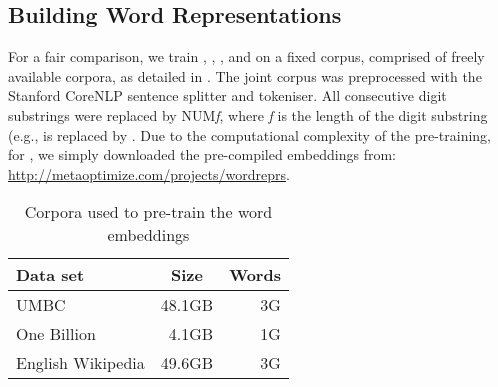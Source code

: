 \subsection{Building Word Representations}
\label{buildingWordRep}

For a fair comparison, we train \brown, \CBOW, \Skipgram, and \Glove on
a fixed corpus, comprised of freely available corpora, as detailed in
. The joint corpus was preprocessed with the
Stanford CoreNLP sentence splitter and tokeniser. All consecutive digit
substrings were replaced by NUM\textit{f}, where \textit{f} is the
length of the digit substring (e.g.,  is replaced by
. Due to the computational complexity of the
pre-training, for \CW, we simply downloaded the pre-compiled embeddings from:
\url{http://metaoptimize.com/projects/wordreprs}.

\begin{table}[t]
\centering
\begin{tabular}{lrr}
\hline
\textbf{Data set} & \multicolumn{1}{c}{\textbf{Size}} & \multicolumn{1}{c}{\textbf{Words}} \\ \hline
UMBC 	& 48.1GB & 3G \\
One Billion 	& 4.1GB & 1G  \\
English Wikipedia & 49.6GB & 3G \\ \hline
\end{tabular}
\caption{Corpora used to pre-train the word embeddings}
\label{wordEmbedCorpora}
\end{table}

